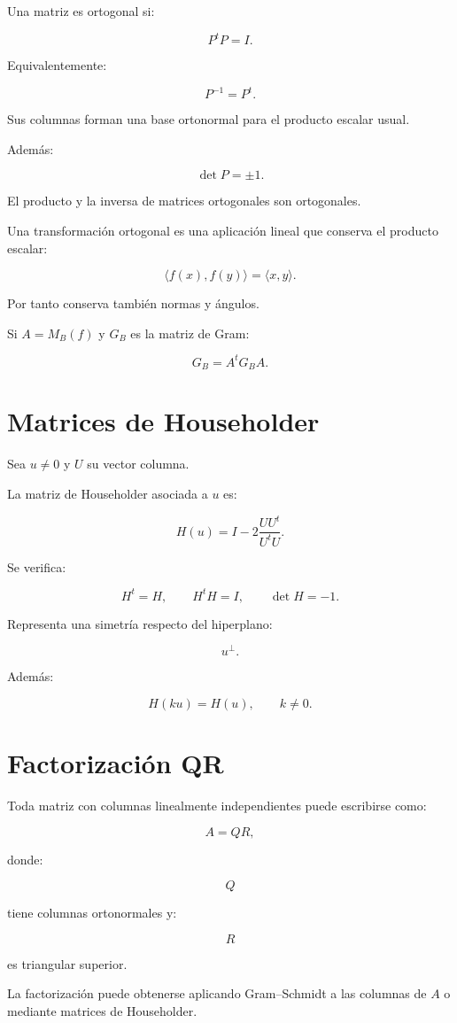 \documentclass[11pt,a4paper]{article}
\begin{document}
Una matriz es ortogonal si:

\[
\boxed{
P^tP=I.
}
\]

Equivalentemente:

\[
\boxed{
P^{-1}=P^t.
}
\]

Sus columnas forman una base ortonormal para el producto escalar usual.

Además:

\[
\boxed{
\det P=\pm1.
}
\]

El producto y la inversa de matrices ortogonales son ortogonales.

Una transformación ortogonal es una aplicación lineal que conserva el producto escalar:

\[
\boxed{
\langle f(x),f(y)\rangle
=
\langle x,y\rangle.
}
\]

Por tanto conserva también normas y ángulos.

Si $A=M_B(f)$ y $G_B$ es la matriz de Gram:

\[
\boxed{
G_B=A^tG_BA.
}
\]

\section{Matrices de Householder}

Sea $u\neq0$ y $U$ su vector columna.

La matriz de Householder asociada a $u$ es:

\[
\boxed{
H(u)
=
I-
2\frac{UU^t}{U^tU}.
}
\]

Se verifica:

\[
\boxed{
H^t=H,
\qquad
H^tH=I,
\qquad
\det H=-1.
}
\]

Representa una simetría respecto del hiperplano:

\[
u^\perp.
\]

Además:

\[
\boxed{
H(ku)=H(u),
\qquad
k\neq0.
}
\]

\section{Factorización QR}

Toda matriz con columnas linealmente independientes puede escribirse como:

\[
\boxed{
A=QR,
}
\]

donde:

\[
Q
\]

tiene columnas ortonormales y:

\[
R
\]

es triangular superior.

La factorización puede obtenerse aplicando Gram--Schmidt a las columnas de $A$ o mediante matrices de Householder.
\end{document}
